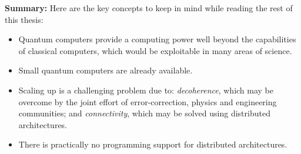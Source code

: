 \begin{mdframed}[backgroundcolor=gray!20,leftmargin=20pt,rightmargin=20pt, innerbottommargin=10pt] 
\small
\textbf{Summary:} Here are the key concepts to keep in mind while reading the rest of this thesis:
\begin{itemize}
\item Quantum computers provide a computing power well beyond the capabilities of classical computers, which would be exploitable in many areas of science.
\item Small quantum computers are already available. 
\item Scaling up is a challenging problem due to: \textit{decoherence}, which may be overcome by the joint effort of error-correction, physics and engineering communities; and \textit{connectivity}, which may be solved using distributed architectures.
\item There is practically no programming support for distributed architectures.
\end{itemize}
\end{mdframed}
